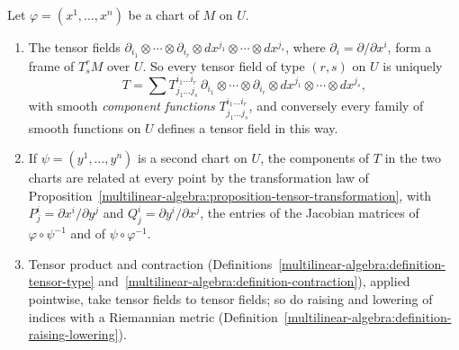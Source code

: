 \begin{proposition}\label{vector-bundles:proposition-tensor-fields-coordinates}
Let $\varphi = (x^1, \ldots, x^n)$ be a chart of $M$ on $U$.
\begin{enumerate}
\item The tensor fields $\partial_{i_1} \otimes \cdots \otimes \partial_{i_r} \otimes dx^{j_1} \otimes \cdots \otimes dx^{j_s}$, where $\partial_i = \partial/\partial x^i$, form a frame of $T^r_sM$ over $U$. So
every tensor field of type $(r,s)$ on $U$ is uniquely
\[
T = \sum T^{i_1 \ldots i_r}_{j_1 \ldots j_s}\,\partial_{i_1} \otimes \cdots \otimes \partial_{i_r} \otimes dx^{j_1} \otimes \cdots \otimes dx^{j_s},
\]
with smooth \emph{component functions} $T^{i_1 \ldots i_r}_{j_1 \ldots j_s}$, and conversely every family of smooth functions on $U$ defines a tensor field in this way.
\item If $\psi = (y^1, \ldots, y^n)$ is a second chart on $U$, the components of $T$ in the two charts are related at every point by the transformation law of
Proposition~\ref{multilinear-algebra:proposition-tensor-transformation}, with $P^i_j = \partial x^i/\partial y^j$ and $Q^i_j = \partial y^i/\partial x^j$, the entries of the
Jacobian matrices of $\varphi \circ \psi^{-1}$ and of $\psi \circ \varphi^{-1}$.
\item Tensor product and contraction (Definitions~\ref{multilinear-algebra:definition-tensor-type} and~\ref{multilinear-algebra:definition-contraction}), applied pointwise, take
tensor fields to tensor fields; so do raising and lowering of indices with a Riemannian metric (Definition~\ref{multilinear-algebra:definition-raising-lowering}).
\end{enumerate}
\end{proposition}

